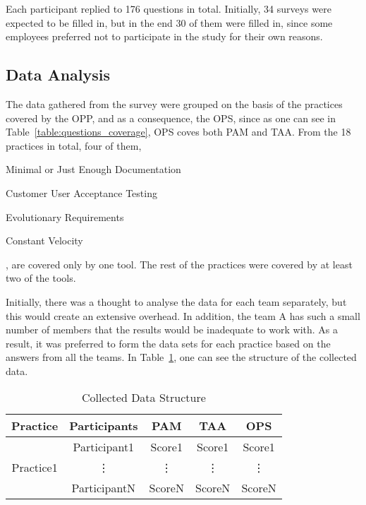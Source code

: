 Each participant replied to 176 questions in total. Initially, 34 surveys were expected to be filled in, but in the end 30 of them were filled in, since some employees preferred not to participate in the study for their own reasons.

\subsection{Data Analysis}
The data gathered from the survey were grouped on the basis of the practices covered by the \ac{OPP}, and as a consequence, the \ac{OPS}, since as one can see in Table~\ref{table:questions_coverage}, \ac{OPS} coves both \ac{PAM} and \ac{TAA}. From the 18 practices in total, four of them, \begin{inparaenum} [a\upshape)] \item Minimal or Just Enough Documentation \item Customer User Acceptance Testing \item Evolutionary Requirements \item Constant Velocity \end{inparaenum}, are covered only by one tool. The rest of the practices were covered by at least two of the tools.

Initially, there was a thought to analyse the data for each team separately, but this would create an extensive overhead. In addition, the team A has such a small number of members that the results would be inadequate to work with. As a result, it was preferred to form the data sets for each practice based on the answers from all the teams. In Table~\ref{table:data_structure}, one can see the structure of the collected data.

\begin{table} [H]
	\caption{Collected Data Structure}
	\label{table:data_structure}
	\begin{tabular}{| c | c | c | c | c |} \hline
	\textbf{Practice} & \textbf{Participants} & \textbf{\ac{PAM}} & \textbf{\ac{TAA}} & \textbf{\ac{OPS}} \\ \hline
	\multirow{3}{*}{Practice1} & Participant1 & Score1 & Score1 & Score1 \\ \hhline{~----}
	& \vdots & \vdots & \vdots  & \vdots \\ \hhline{~----}
	& ParticipantN & ScoreN & ScoreN & ScoreN \\ \hline
	\end{tabular}
\end{table}

